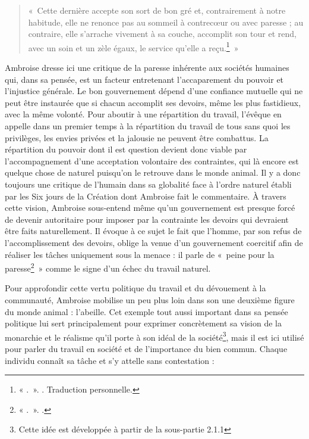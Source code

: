 \bigskip

\begin{quote}
    «~Cette dernière accepte son sort de bon gré et, contrairement à notre habitude, elle ne renonce pas au sommeil à contrecœur ou avec paresse ; au contraire, elle s'arrache vivement à sa couche, accomplit son tour et rend, avec un soin et un zèle égaux, le service qu'elle a reçu.\footnote{« .~». \cite[\nopp V, 15, 50]{ambroise_csel_32_1}. Traduction personnelle.}~»
\end{quote}

\bigskip

Ambroise dresse ici une critique de la paresse inhérente aux sociétés humaines qui, dans sa pensée, est un facteur entretenant l'accaparement du pouvoir et l'injustice générale. Le bon gouvernement dépend d'une confiance mutuelle qui ne peut être instaurée que si chacun accomplit ses devoirs, même les plus fastidieux, avec la même volonté. Pour aboutir à une répartition du travail, l'évêque en appelle dans un premier temps à la répartition du travail de tous sans quoi les privilèges, les envies privées et la jalousie ne peuvent être combattus. La répartition du pouvoir dont il est question devient donc viable par l'accompagnement d'une acceptation volontaire des contraintes, qui là encore est quelque chose de naturel puisqu'on le retrouve dans le monde animal. Il y a donc toujours une critique de l'humain dans sa globalité face à l'ordre naturel établi par les Six jours de la Création dont Ambroise fait le commentaire. À travers cette vision, Ambroise sous-entend même qu'un gouvernement est presque forcé de devenir autoritaire pour imposer par la contrainte les devoirs qui devraient être faits naturellement. Il évoque à ce sujet le fait que l'homme, par son refus de l'accomplissement des devoirs, oblige la venue d'un gouvernement coercitif afin de réaliser les tâches uniquement sous la menace : il parle de «~peine pour la paresse\footnote{« .~». \cite[\nopp V, 15, 52]{ambroise_csel_32_1}.}~» comme le signe d'un échec du travail naturel.

\bigskip

Pour approfondir cette vertu politique du travail et du dévouement à la communauté, Ambroise mobilise un peu plus loin dans son  une deuxième figure du monde animal : l'abeille. Cet exemple tout aussi important dans sa pensée politique lui sert principalement pour exprimer concrètement sa vision de la monarchie et le réalisme qu'il porte à son idéal de la société\footnote{Cette idée est développée à partir de la sous-partie 2.1.1}, mais il est ici utilisé pour parler du travail en société et de l'importance du bien commun. Chaque individu connaît sa tâche et s'y attelle sans contestation :

